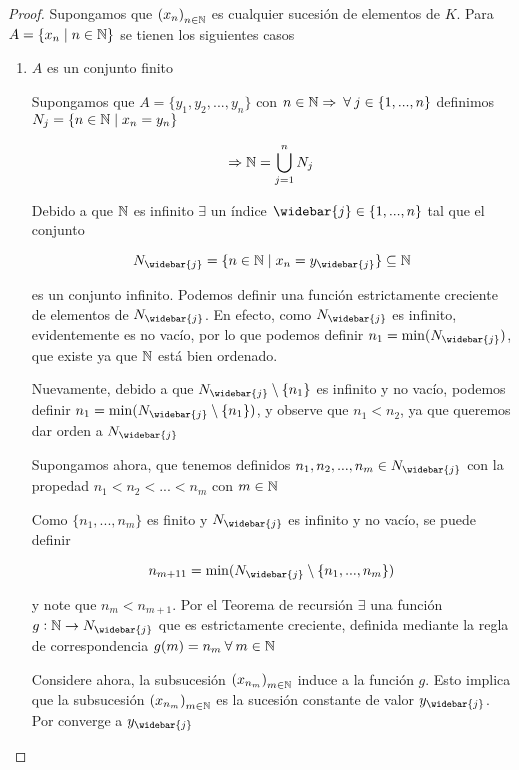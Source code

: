 \begin{proof}
    Supongamos que ${\left( x_n \right)}_{n \in \mathbb{N}}$ es cualquier sucesión de elementos de $K$. Para $A = \{ x_n \mid n \in \mathbb{N} \}$ se tienen los siguientes casos

    \begin{enumerate}
        \item $A$ es un conjunto finito

        Supongamos que $A = \{ y_1, y_2, ..., y_n \}$ con $n \in \mathbb{N} \Rightarrow \: \forall \: j \in \{ 1 , ..., n \}$ definimos $N_j = \{ n \in \mathbb{N} \mid x_n = y_n \}$

        $$\Rightarrow \mathbb{N} = \bigcup_{j=1}^{n} N_j$$

        Debido a que $\mathbb{N}$ es infinito $\exists$ un índice $\widebar{j} \in \{ 1 , ..., n \}$ tal que el conjunto

        $$N_{\widebar{j}} = \{ n \in \N \mid x_n = y_{\widebar{j}} \} \subseteq \N$$

        es un conjunto infinito. Podemos definir una función estrictamente creciente de elementos de $N_{\widebar{j}}$. En efecto, como $N_{\widebar{j}}$ es infinito, evidentemente es no vacío, por lo que podemos definir $n_1 = \min (N_{\widebar{j}})$, que existe ya que $\mathbb{N}$ está bien ordenado.

        Nuevamente, debido a que $N_{\widebar{j}} \setminus \{ n_1 \}$ es infinito y no vacío, podemos definir $n_1 = \min (N_{\widebar{j}} \setminus \{ n_1 \})$, y observe que $n_1 < n_2$, ya que queremos dar orden a $N_{\widebar{j}}$

        Supongamos ahora, que tenemos definidos $n_1, n_2, ..., n_m \in N_{\widebar{j}}$ con la propedad $n_1 < n_2 < ... < n_m$ con $m \in \mathbb{N}$

        Como $\{ n_1, ..., n_m \}$ es finito y $N_{\widebar{j}}$ es infinito y no vacío, se puede definir 

        $$n_{m+11} = \min (N_{\widebar{j}} \setminus \{ n_1, ..., n_m \} )$$

        y note que $n_m < n_{m+1}$. Por el Teorema de recursión $\exists$ una función $g : \N \to N_{\widebar{j}}$ que es estrictamente creciente, definida mediante la regla de correspondencia $g(m) = n_m \: \forall \: m \in \mathbb{N}$

        Considere ahora, la subsucesión  ${\left( x_{n_m}\right)}_{m \in \mathbb{N}}$ induce a la función $g$. Esto implica que la subsucesión  ${\left( x_{n_m}\right)}_{m \in \mathbb{N}}$ es la sucesión constante de valor $y_{\widebar{j}}$. Por  converge a $y_{\widebar{j}}$


\end{enumerate}
\end{proof}
